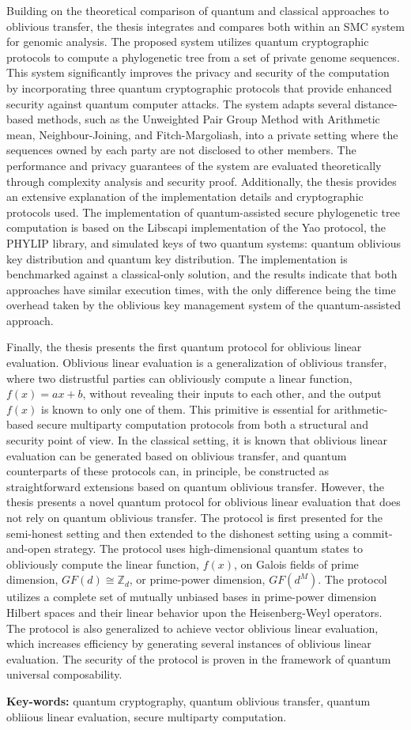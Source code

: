 Building on the theoretical comparison of quantum and classical approaches to oblivious transfer, the thesis integrates and compares both within an SMC system for genomic analysis. The proposed system utilizes quantum cryptographic protocols to compute a phylogenetic tree from a set of private genome sequences. This system significantly improves the privacy and security of the computation by incorporating three quantum cryptographic protocols that provide enhanced security against quantum computer attacks. The system adapts several distance-based methods, such as the Unweighted Pair Group Method with Arithmetic mean, Neighbour-Joining, and Fitch-Margoliash, into a private setting where the sequences owned by each party are not disclosed to other members. The performance and privacy guarantees of the system are evaluated theoretically through complexity analysis and security proof. Additionally, the thesis provides an extensive explanation of the implementation details and cryptographic protocols used. The implementation of quantum-assisted secure phylogenetic tree computation is based on the Libscapi implementation of the Yao protocol, the PHYLIP library, and simulated keys of two quantum systems: quantum oblivious key distribution and quantum key distribution. The implementation is benchmarked against a classical-only solution, and the results indicate that both approaches have similar execution times, with the only difference being the time overhead taken by the oblivious key management system of the quantum-assisted approach.

Finally, the thesis presents the first quantum protocol for oblivious linear evaluation. Oblivious linear evaluation is a generalization of oblivious transfer, where two distrustful parties can obliviously compute a linear function, $f(x) = ax + b$, without revealing their inputs to each other, and the output $f(x)$ is known to only one of them. This primitive is essential for arithmetic-based secure multiparty computation protocols from both a structural and security point of view. In the classical setting, it is known that oblivious linear evaluation can be generated based on oblivious transfer, and quantum counterparts of these protocols can, in principle, be constructed as straightforward extensions based on quantum oblivious transfer. However, the thesis presents a novel quantum protocol for oblivious linear evaluation that does not rely on quantum oblivious transfer. The protocol is first presented for the semi-honest setting and then extended to the dishonest setting using a commit-and-open strategy. The protocol uses high-dimensional quantum states to obliviously compute the linear function, $f(x)$, on Galois fields of prime dimension, $GF(d) \cong \mathbb{Z}_d$, or prime-power dimension, $GF(d^M)$. The protocol utilizes a complete set of mutually unbiased bases in prime-power dimension Hilbert spaces and their linear behavior upon the Heisenberg-Weyl operators. The protocol is also generalized to achieve vector oblivious linear evaluation, which increases efficiency by generating several instances of oblivious linear evaluation. The security of the protocol is proven in the framework of quantum universal composability.

\vfill

\begin{flushleft}
\textbf{Key-words:} quantum cryptography, quantum oblivious transfer, quantum obliious linear evaluation, secure multiparty computation.
\end{flushleft}
